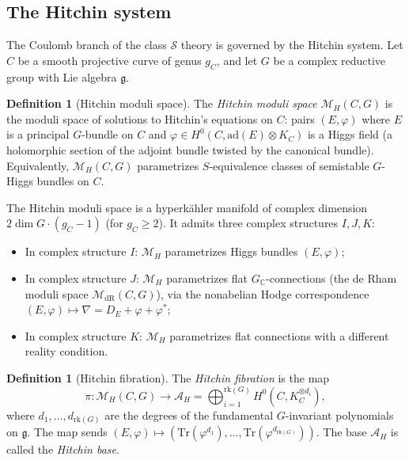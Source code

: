\documentclass[11pt]{article}
\theoremstyle{definition}
\newtheorem{definition}[theorem]{Definition}
\theoremstyle{remark}
\newcommand{\cA}{\mathcal{A}}
\newcommand{\cM}{\mathcal{M}}
\newcommand{\frakg}{\mathfrak{g}}
\newcommand{\Tr}{\mathrm{Tr}}
\begin{document}
\subsection{The Hitchin system}
\label{subsec:hitchin-system}

The Coulomb branch of the class $\mathcal{S}$ theory is governed by the Hitchin system.
Let $C$ be a smooth projective curve of genus $g_C$, and let $G$ be a complex reductive group
with Lie algebra $\frakg$.

\begin{definition}[Hitchin moduli space]
 \label{def:hitchin-moduli}
 The \emph{Hitchin moduli space} $\cM_H(C, G)$ is the moduli space of solutions to Hitchin's
 equations on $C$: pairs $(E, \varphi)$ where $E$ is a principal $G$-bundle on $C$ and
 $\varphi \in H^0(C, \mathrm{ad}(E) \otimes K_C)$ is a Higgs field (a holomorphic section of the
 adjoint bundle twisted by the canonical bundle). Equivalently, $\cM_H(C, G)$ parametrizes
 $S$-equivalence classes of semistable $G$-Higgs bundles on $C$.
\end{definition}

The Hitchin moduli space is a hyperk\"ahler manifold of complex dimension
$2 \dim G \cdot (g_C - 1)$ (for $g_C \geq 2$). It admits three complex structures $I, J, K$:
\begin{itemize}[nosep]
 \item In complex structure $I$: $\cM_H$ parametrizes Higgs bundles $(E, \varphi)$;
 \item In complex structure $J$: $\cM_H$ parametrizes flat $G_\mathbb{C}$-connections (the
 de Rham moduli space $\cM_{\mathrm{dR}}(C, G)$), via the nonabelian Hodge correspondence
 $(E, \varphi) \mapsto \nabla = D_E + \varphi + \varphi^*$;
 \item In complex structure $K$: $\cM_H$ parametrizes flat connections with a different reality
 condition.
\end{itemize}

\begin{definition}[Hitchin fibration]
 \label{def:hitchin-fibration}
 The \emph{Hitchin fibration} is the map
 \begin{equation}
 \label{eq:hitchin-fibration}
 \pi \colon \cM_H(C, G) \longrightarrow \cA_H = \bigoplus_{i=1}^{\mathrm{rk}(G)} H^0(C, K_C^{\otimes d_i}),
 \end{equation}
 where $d_1, \ldots, d_{\mathrm{rk}(G)}$ are the degrees of the fundamental $G$-invariant
 polynomials on $\frakg$. The map sends $(E, \varphi) \mapsto (\Tr(\varphi^{d_1}), \ldots,
 \Tr(\varphi^{d_{\mathrm{rk}(G)}}))$. The base $\cA_H$ is called the \emph{Hitchin base}.
\end{definition}
\end{document}
